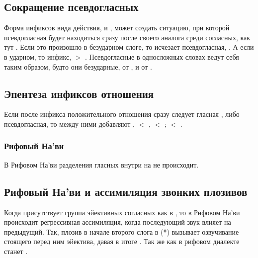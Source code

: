 \subsection{Сокращение псевдо\-гласных} 
 Форма инфиксов вида действия, 
и , может создать ситуацию, при которой псевдогласная будет находиться сразу после своего аналога среди согласных, как тут .  Если это произошло в безударном слоге, то исчезает псевдогласная, .  А если в ударном, то инфикс,  $>$
.  Псевдогласные в односложных словах ведут себя таким образом, будто они безударные,  от , и 
от .

\subsection{Эпентеза инфиксов отношения} Если после инфикса положительного отношения  сразу следует гласная ,  либо псевдогласная, то между ними добавляют 
,  $<$ ,  $<$
;  $<$ .
\label{l-and-s:eiy-epenth}

\subsubsection{Рифовый На'ви} 
В Рифовом На'ви разделения гласных внутри  на  не происходит.


\subsection{Рифовый На'ви и ассимиляция звонких плозивов} 
Когда присутствует группа эйективных согласных как в  , то в Рифовом На'ви происходит регрессивная ассимиляция, когда последующий звук влияет на предыдущий.
Так, плозив в начале второго слога в (*) вызывает озвучивание стоящего перед ним эйектива, давая в итоге .
Так же как   в рифовом диалекте станет .

